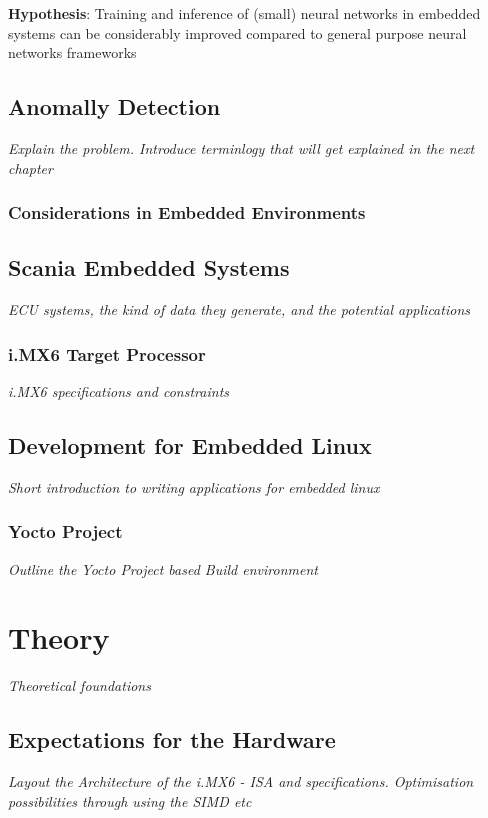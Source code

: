 \vspace{1em}
\noindent \textbf{Hypothesis}: Training and inference of (small) neural networks in embedded systems can be considerably improved compared to general purpose neural networks frameworks

\section{Anomally Detection}
\textit{Explain the problem. Introduce terminlogy that will get explained in the next chapter}

\subsection{Considerations in Embedded Environments}

\section{Scania Embedded Systems}
\textit{ECU systems, the kind of data they generate, and the potential applications}

\subsection{i.MX6 Target Processor}
\textit{i.MX6 specifications and constraints}

\section{Development for Embedded Linux}
\textit{Short introduction to writing applications for embedded linux}

\subsection{Yocto Project}
\textit{Outline the Yocto Project based Build environment}

\chapter{Theory}
\textit{Theoretical foundations}

\section{Expectations for the Hardware}
\textit{Layout the Architecture of the i.MX6 - ISA and specifications. Optimisation possibilities through using the SIMD etc}

